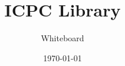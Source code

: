 \documentclass[titlepage, landscape, a4paper, twocolumn, 10pt]{ujarticle}
\begin{document}
\title{ICPC Library}
\author{Whiteboard}
\date{\today}

\maketitle

\end{document}
